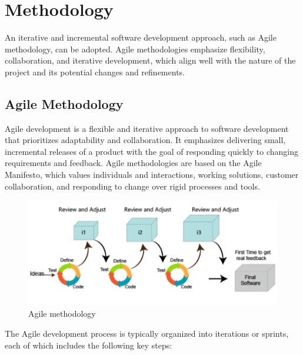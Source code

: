 \setcounter{page}{11}
\chapter{Methodology}
An iterative and incremental software development approach, such as Agile methodology, can be adopted. Agile methodologies emphasize flexibility, collaboration,
and iterative development, which align well with the nature of the project and its
potential changes and refinements.\\

\section{Agile Methodology}
Agile development is a flexible and iterative approach to software development that prioritizes adaptability and collaboration. It emphasizes delivering small, incremental releases of a product with the goal of responding quickly to changing requirements and feedback. Agile methodologies are based on the Agile Manifesto, which values individuals and interactions, working solutions, customer collaboration, and responding to change over rigid processes and tools.\\
\begin{figure}[H]
    \centering
    \includegraphics[width=1\textwidth]{img/agile.png}
    \caption{Agile methodology}
\end{figure}
The Agile development process is typically organized into iterations or sprints, each of which includes the following key steps:\\
